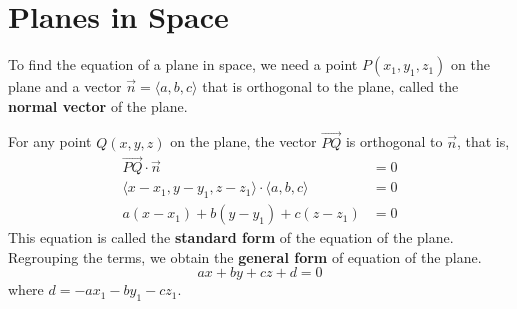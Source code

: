 \chapter{Planes in Space}

\begin{center}
\end{center}

To find the equation of a plane in space, we need a point $P(x_1, y_1, z_1)$ on
the plane and a vector $\vec{n} = \langle a, b, c \rangle$ that is orthogonal
to the plane, called the \textbf{normal vector} of the plane.

For any point $Q(x, y, z)$ on the plane, the vector $\overrightarrow{PQ}$ is
orthogonal to $\vec{n}$, that is,
\begin{align*}
    \overrightarrow{PQ} \cdot \vec{n}                                       & = 0 \\
    \langle x - x_1, y - y_1, z - z_1 \rangle \cdot \langle a, b, c \rangle & = 0 \\
    a(x - x_1) + b(y - y_1) + c(z - z_1)                                    & = 0
\end{align*}
This equation is called the \textbf{standard form} of the equation of the plane. Regrouping the terms, we obtain the \textbf{general form} of equation of the plane. \[ax + by + cz + d = 0\] where $d = -ax_1 - by_1 - cz_1$.

